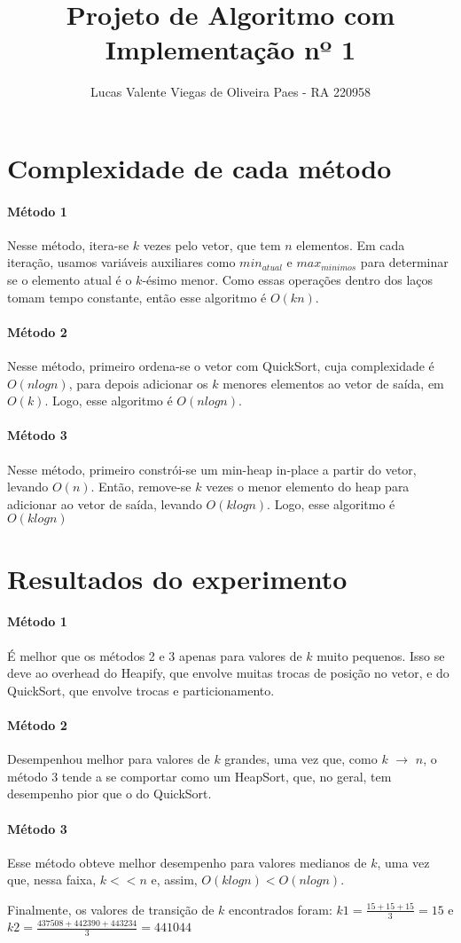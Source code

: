 \documentclass[12pt,a4paper]{article}
\title{Projeto de Algoritmo com Implementação nº 1}
\date{}
\author{Lucas Valente Viegas de Oliveira Paes - RA 220958}
\begin{document}
  \maketitle

  \section{Complexidade de cada método}
  \paragraph{Método 1}
  Nesse método, itera-se $k$ vezes pelo vetor, que tem $n$ elementos. Em cada iteração, usamos variáveis auxiliares como $min_{atual}$ e $max_{minimos}$ para determinar se o elemento atual é o $k$-ésimo menor. Como essas operações dentro dos laços tomam tempo constante, então esse algoritmo é $O(kn)$.

  \paragraph{Método 2}
  Nesse método, primeiro ordena-se o vetor com QuickSort, cuja complexidade é $O(nlogn)$, para depois adicionar os $k$ menores elementos ao vetor de saída, em $O(k)$. Logo, esse algoritmo é $O(nlogn)$.

  \paragraph{Método 3}
  Nesse método, primeiro constrói-se um min-heap in-place a partir do vetor, levando $O(n)$. Então, remove-se $k$ vezes o menor elemento do heap para adicionar ao vetor de saída, levando $O(klogn)$. Logo, esse algoritmo é $O(klogn)$

  \section{Resultados do experimento}
  \paragraph{Método 1}
  É melhor que os métodos 2 e 3 apenas para valores de $k$ muito pequenos. Isso se deve ao overhead do Heapify, que envolve muitas trocas de posição no vetor, e do QuickSort, que envolve trocas e particionamento.

  \paragraph{Método 2}
  Desempenhou melhor para valores de $k$ grandes, uma vez que, como $k$ $\rightarrow$ $n$, o método 3 tende a se comportar como um HeapSort, que, no geral, tem desempenho pior que o do QuickSort.

  \paragraph{Método 3}
  Esse método obteve melhor desempenho para valores medianos de $k$, uma vez que, nessa faixa, $k << n$ e, assim, $O(klogn) < O(nlogn)$.

  Finalmente, os valores de transição de $k$ encontrados foram: $k1 = \frac{15 + 15 + 15}{3} = 15$ e $k2 = \frac{437508 + 442390 + 443234}{3} = 441044$
\end{document}
